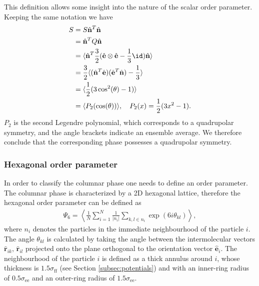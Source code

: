 This definition allows some insight into the nature of the scalar order parameter. Keeping the same notation we have
\begin{align*}
    S &= S \hat{\mathbf{n}}^T \hat{\mathbf{n}}    \\
      &= \hat{\mathbf{n}}^T Q \hat{\mathbf{n}}\\
      & = \langle \hat{\mathbf{n}}^T \frac{3}{2}  (\hat{\mathbf{e}}\otimes \hat{\mathbf{e}} - \frac{1}{3} \id) \hat{\mathbf{n}}\rangle\\
      &=  \frac{3}{2}  \langle (\hat{\mathbf{n}}^T \hat{\mathbf{e}}) (\hat{\mathbf{e}}^T \hat{\mathbf{n}}) - \frac{1}{3} \rangle\\
      &=   \langle \frac{1}{2}( 3\cos^2(\theta) - 1) \rangle \\
      &=   \langle P_2(\cos(\theta)) \rangle , \quad  P_2(x)= \frac{1}{2}( 3x^2 - 1).
\end{align*}
$P_2$ is the second Legendre polynomial, which corresponds to a quadrupolar symmetry, and the angle brackets indicate an ensemble average. We therefore conclude that the corresponding phase possesses a quadrupolar symmetry.
\subsubsection{Hexagonal order parameter}
In order to classify the columnar phase one needs to define an order parameter. The columnar phase is characterized by a 2D hexagonal lattice, therefore the hexagonal order parameter can be defined as
\begin{align}
    \Psi_6 = \left\langle \frac{1}{N} \displaystyle\sum^N_{i=1}  \frac{1}{|n_i|}\displaystyle\sum_{k,l\in n_i} \exp(6i \theta_{kl})  \right\rangle,
\end{align}
where $n_i$ denotes the particles in the immediate neighbourhood of the particle $i$. The angle $\theta_{kl}$ is calculated by taking the angle between the intermolecular vectors $\hat{\mathbf{r}}_{ik},\,\hat{\mathbf{r}}_{il}$ projected onto the plane orthogonal to the orientation vector $\hat{\mathbf{e}}_i$. The neighbourhood of the particle $i$ is defined as a thick annulus around $i$, whose thickness is $1.5\sigma_{\text{ff}}$ (see Section \ref{subsec:potentials}) and with an inner-ring radius of $0.5\sigma_{\text{ee}}$ and an outer-ring radius of $1.5\sigma_{\text{ee}}$. 

